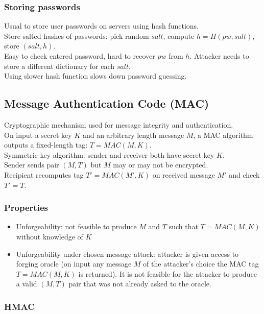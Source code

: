\documentclass{article}
\begin{document}
\subsubsection{Storing passwords}

Usual to store user passwords on servers using hash functions.\\
Store salted hashes of passwords: pick random $salt$, compute $h=H(pw, salt)$, store $(salt,h)$.\\
Easy to check entered password, hard to recover $pw$ from $h$. Attacker needs to store a different dictionary for each $salt$.\\
Using slower hash function slows down password guessing.

\subsection{Message Authentication Code (MAC)}

Cryptographic mechanism used for message integrity and authentication.\\
On input a secret key $K$ and an arbitrary length message $M$, a MAC algorithm outputs a fixed-length tag: $T=MAC(M,K)$.\\
Symmetric key algorithm: sender and receiver both have secret key $K$.\\
Sender sends pair $(M,T)$ but $M$ may or may not be encrypted.\\
Recipient recomputes tag $T' = MAC(M', K)$ on received message $M'$ and check $T'=T$.

\subsubsection{Properties}

\begin{itemize}
    \item Unforgeability: not feasible to produce $M$ and $T$ such that $T=MAC(M,K)$ without knowledge of $K$
    \item Unforgeability under chosen message attack: attacker is given access to forging oracle (on input any message $M$ of the attacker's choice the MAC tag $T=MAC(M,K)$ is returned). It is not feasible for the attacker to produce a valid $(M,T)$ pair that was not already asked to the oracle.
\end{itemize} 

\subsubsection{HMAC}
\end{document}
